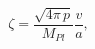 \begin{equation}\label{eq:Bardeen}
 \zeta=\frac{\sqrt{4\pi\, p}}{M_{Pl}}\frac{v}{a},
\end{equation}

